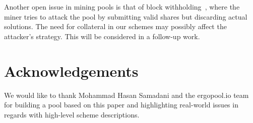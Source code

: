 \documentclass{llncs}
\begin{document}
Another open issue in mining pools is that of block withholding~\cite{courtois2014subversive}, where the miner tries to attack the pool by submitting valid shares but discarding actual solutions. The need for collateral in our schemes may possibly affect the attacker's strategy. This will be considered in a follow-up work.

\section*{Acknowledgements}
\label{*acknowledgements}

We would like to thank Mohammad Hasan Samadani and the ergopool.io team for building a pool based on this paper and highlighting real-world issues in regards with high-level scheme descriptions.   



\appendix
\end{document}

